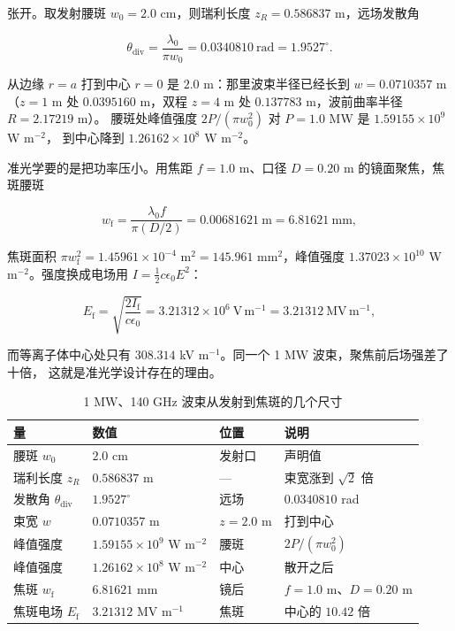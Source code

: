 张开。取发射腰斑 $w_0=2.0$ cm，则瑞利长度 $z_R=0.586837$ m，远场发散角

\begin{equation}
\theta_\mathrm{div}=\frac{\lambda_0}{\pi w_0}=0.0340810\ \mathrm{rad}=1.9527^\circ .
\label{eq:app-as-rayleigh}
\end{equation}

从边缘 $r=a$ 打到中心 $r=0$ 是 $2.0$ m：那里波束半径已经长到 $w=0.0710357$ m
（$z=1$ m 处 $0.0395160$ m，双程 $z=4$ m 处 $0.137783$ m，波前曲率半径 $R=2.17219$ m）。
腰斑处峰值强度 $2P/(\pi w_0^2)$ 对 $P=1.0$ MW 是 $1.59155\times10^{9}$ W m$^{-2}$，
到中心降到 $1.26162\times10^{8}$ W m$^{-2}$。

准光学要的是把功率压小。用焦距 $f=1.0$ m、口径 $D=0.20$ m 的镜面聚焦，焦斑腰斑

\begin{equation}
w_\mathrm{f}=\frac{\lambda_0 f}{\pi (D/2)}=0.00681621\ \mathrm{m}=6.81621\ \mathrm{mm},
\label{eq:app-as-focus}
\end{equation}

焦斑面积 $\pi w_\mathrm{f}^2=1.45961\times10^{-4}$ m$^2=145.961$ mm$^2$，峰值强度
$1.37023\times10^{10}$ W m$^{-2}$。强度换成电场用 $I=\tfrac12 c\epsilon_0 E^2$：

\begin{equation}
E_\mathrm{f}=\sqrt{\frac{2I_\mathrm{f}}{c\epsilon_0}}=3.21312\times10^{6}\ \mathrm{V\,m^{-1}}
=3.21312\ \mathrm{MV\,m^{-1}},
\label{eq:app-as-intensity}
\end{equation}

而等离子体中心处只有 $308.314$ kV m$^{-1}$。同一个 1 MW 波束，聚焦前后场强差了十倍，
这就是准光学设计存在的理由。

\begin{table}[htbp]
\centering
\small
\caption{1 MW、140 GHz 波束从发射到焦斑的几个尺寸}
\label{tab:app-as-beam}
\begin{tabular}{p{3.3cm}p{3.1cm}p{3.1cm}p{3.5cm}}
\hline
量 & 数值 & 位置 & 说明 \\
\hline
腰斑 $w_0$ & $2.0$ cm & 发射口 & 声明值 \\
瑞利长度 $z_R$ & $0.586837$ m & --- & 束宽涨到 $\sqrt2$ 倍 \\
发散角 $\theta_\mathrm{div}$ & $1.9527^\circ$ & 远场 & $0.0340810$ rad \\
束宽 $w$ & $0.0710357$ m & $z=2.0$ m & 打到中心 \\
峰值强度 & $1.59155\times10^{9}$ W m$^{-2}$ & 腰斑 & $2P/(\pi w_0^2)$ \\
峰值强度 & $1.26162\times10^{8}$ W m$^{-2}$ & 中心 & 散开之后 \\
焦斑 $w_\mathrm{f}$ & $6.81621$ mm & 镜后 & $f=1.0$ m、$D=0.20$ m \\
焦斑电场 $E_\mathrm{f}$ & $3.21312$ MV m$^{-1}$ & 焦斑 & 中心的 $10.42$ 倍 \\
\hline
\end{tabular}
\end{table}

